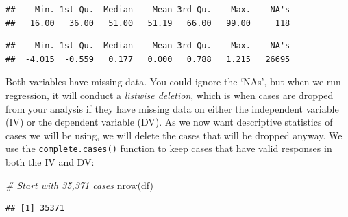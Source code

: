 \documentclass[
]{book}
\newenvironment{Shaded}{\begin{snugshade}}{\end{snugshade}}
\newcommand{\CommentTok}[1]{\textcolor[rgb]{0.56,0.35,0.01}{\textit{#1}}}
\newcommand{\FunctionTok}[1]{\textcolor[rgb]{0.00,0.00,0.00}{#1}}
\newcommand{\NormalTok}[1]{#1}
\newcommand{\OtherTok}[1]{\textcolor[rgb]{0.56,0.35,0.01}{#1}}
\newcommand{\SpecialCharTok}[1]{\textcolor[rgb]{0.00,0.00,0.00}{#1}}
\begin{document}
\begin{Shaded}
\end{Shaded}

\begin{verbatim}
##    Min. 1st Qu.  Median    Mean 3rd Qu.    Max.    NA's 
##   16.00   36.00   51.00   51.19   66.00   99.00     118
\end{verbatim}

\begin{Shaded}
\end{Shaded}

\begin{verbatim}
##    Min. 1st Qu.  Median    Mean 3rd Qu.    Max.    NA's 
##  -4.015  -0.559   0.177   0.000   0.788   1.215   26695
\end{verbatim}

Both variables have missing data. You could ignore the `NAs', but when we run regression, it will conduct a \emph{listwise deletion}, which is when cases are dropped from your analysis if they have missing data on either the independent variable (IV) or the dependent variable (DV). As we now want descriptive statistics of cases we will be using, we will delete the cases that will be dropped anyway. We use the \texttt{complete.cases()} function to keep cases that have valid responses in both the IV and DV:

\begin{Shaded}
\begin{Highlighting}[]
\CommentTok{\# Start with 35,371 cases}
\FunctionTok{nrow}\NormalTok{(df) }
\end{Highlighting}
\end{Shaded}

\begin{verbatim}
## [1] 35371
\end{verbatim}

\begin{Shaded}
\end{Shaded}
\end{document}
